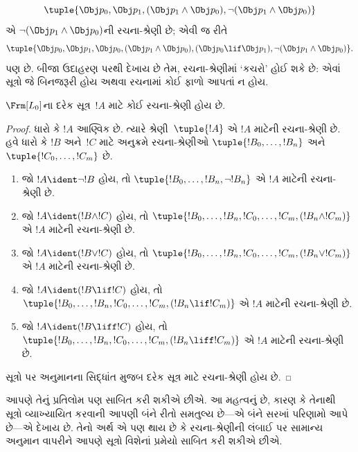 \begin{ex}
\[
\tuple{
    \Obj p_0,
    \Obj p_1,
    (\Obj p_1 \land \Obj p_0),
    \lnot (\Obj p_1 \land \Obj p_0)
}
\]
એ $\lnot (\Obj p_1 \land \Obj p_0)$ની રચના-શ્રેણી છે; એવી જ રીતે
\[
\tuple{
    \Obj p_0,
    \Obj p_1,
    \Obj p_0,
    (\Obj p_1 \land \Obj p_0),
    (\Obj p_0 \lif \Obj p_1),
    \lnot (\Obj p_1 \land \Obj p_0)
}.
\]
પણ છે.
બીજા ઉદાહરણ પરથી દેખાય છે તેમ, રચના-શ્રેણીમાં `કચરો' હોઈ શકે છે:
એવાં સૂત્રો જે બિનજરૂરી હોય અથવા રચનામાં કોઈ ફાળો આપતાં ન હોય.
\end{ex}

\begin{prop}
$\Frm[L_0]$ના દરેક સૂત્ર~$!A$ માટે કોઈ રચના-શ્રેણી હોય છે.
\end{prop}

\begin{proof}
ધારો કે $!A$ આણ્વિક છે. ત્યારે શ્રેણી~$\tuple{!A}$ એ $!A$ માટેની
રચના-શ્રેણી છે.
હવે ધારો કે $!B$ અને~$!C$ માટે અનુક્રમે રચના-શ્રેણીઓ
$\tuple{!B_0,\dotsc,!B_n}$ અને $\tuple{!C_0,\dotsc,!C_m}$ છે.
\begin{enumerate}
  \item જો $!A \ident \lnot !B$ હોય,
      તો $\tuple{!B_0,\dotsc,!B_n,\lnot !B_n}$
      એ $!A$ માટેની રચના-શ્રેણી છે.
  \item જો $!A \ident (!B \land !C)$ હોય,
      તો $\tuple{!B_0,\dotsc,!B_n,!C_0,\dotsc,!C_m,(!B_n \land !C_m)}$
      એ $!A$ માટેની રચના-શ્રેણી છે.
  \item જો $!A \ident (!B \lor !C)$ હોય,
      તો $\tuple{!B_0,\dotsc,!B_n,!C_0,\dotsc,!C_m,(!B_n \lor !C_m)}$
      એ $!A$ માટેની રચના-શ્રેણી છે.
  \item જો $!A \ident (!B \lif !C)$ હોય,
      તો $\tuple{!B_0,\dotsc,!B_n,!C_0,\dotsc,!C_m,(!B_n \lif !C_m)}$
      એ $!A$ માટેની રચના-શ્રેણી છે.
  \item જો $!A \ident (!B \liff !C)$ હોય,
      તો $\tuple{!B_0,\dotsc,!B_n,!C_0,\dotsc,!C_m,(!B_n \liff !C_m)}$
      એ $!A$ માટેની રચના-શ્રેણી છે.
\end{enumerate}
સૂત્રો પર અનુમાનના સિદ્ધાંત મુજબ દરેક સૂત્ર માટે
રચના-શ્રેણી હોય છે.
\end{proof}

આપણે તેનું પ્રતિલોમ પણ સાબિત કરી શકીએ છીએ. આ મહત્વનું છે, કારણ કે
તેનાથી સૂત્રો વ્યાખ્યાયિત કરવાની આપણી બંને રીતો સમતુલ્ય છે---એ બંને
સરખાં પરિણામો આપે છે---એ દેખાય છે. તેનો અર્થ એ પણ થાય છે કે
રચના-શ્રેણીની લંબાઈ પર સામાન્ય અનુમાન વાપરીને આપણે સૂત્રો વિશેનાં
પ્રમેયો સાબિત કરી શકીએ છીએ.

